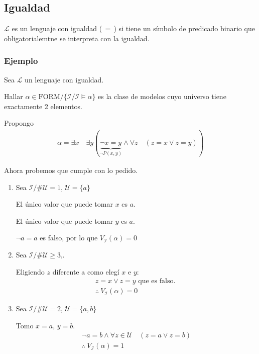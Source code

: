     \subsection{Igualdad}

    \begin{definicion}{}{}
        $\mathcal{L}$ es un lenguaje con igualdad ($\,=\,$) si tiene un símbolo
        de predicado binario que obligatorialemtne se interpreta con la igualdad.
    \end{definicion}

    \subsubsection{Ejemplo}

    Sea $\mathcal{L}$ un lenguaje con igualdad.

    Hallar 
    $\alpha \in \mathrm{FORM} / \{ \mathcal{I} / \mathcal{I} \vDash \alpha \}$
    es la clase de modelos cuyo universo tiene exactamente 2 elementos.

    Propongo
    \begin{gather*}
        \alpha = \exists x \quad \exists y ( \underbrace{\neg x = y}_{\neg P(x,y)}
        \wedge \forall z \quad (z = x \vee z = y)) 
    \end{gather*}

    Ahora probemos que cumple con lo pedido.
    \begin{enumerate}
        \item Sea $\mathcal{I} / \# \mathcal{U} = 1$, $\mathcal{U} = \{ a \}$

            El único valor que puede tomar $x$ es $a$.

            El único valor que puede tomar $y$ es $a$.
            \begin{center}
                $\neg a = a$ es falso, por lo que $V_{\mathcal{I}}(\alpha) = 0$
            \end{center}

        \item Sea $\mathcal{I} / \# \mathcal{U} \geq 3$,.

            Eligiendo $z$ diferente a como elegí $x$ e $y$:
            \begin{gather*}
                z = x \vee z = y \text{ que es falso. }\\ 
                \therefore ~ V_{\mathcal{I}} (\alpha) = 0
            \end{gather*}

        \item Sea $\mathcal{I}/ \# \mathcal{U} = 2$, $\mathcal{U} = \{ a,b \}$

            Tomo $x = a$, $y = b$.
            \begin{gather*}
                \neg a = b \wedge \forall z \in \mathcal{U} \quad (z=a \vee z=b) \\
                \therefore ~ V_{\mathcal{I}} (\alpha) =  1
            \end{gather*}
    \end{enumerate}

